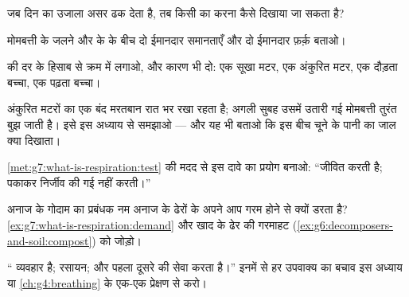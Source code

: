 \begin{exercise}[$\star$]\label{exo:g7:what-is-respiration:6}
जब दिन का उजाला असर ढक देता है, तब किसी  का  करना कैसे दिखाया
जा सकता है?
\end{exercise}

\begin{exercise}[$\star\star$]\label{exo:g7:what-is-respiration:7}
मोमबत्ती के जलने और  के  के बीच दो ईमानदार समानताएँ और दो
ईमानदार फ़र्क़ बताओ।
\end{exercise}

\begin{exercise}[$\star\star$]\label{exo:g7:what-is-respiration:8}
 की दर के हिसाब से क्रम में लगाओ, और कारण भी दो: एक सूखा मटर, एक
अंकुरित मटर, एक दौड़ता बच्चा, एक पढ़ता बच्चा।
\end{exercise}

\begin{exercise}[$\star\star$]\label{exo:g7:what-is-respiration:9}
अंकुरित मटरों का एक बंद मरतबान रात भर रखा रहता है; अगली सुबह उसमें
उतारी गई मोमबत्ती तुरंत बुझ जाती है। इसे इस अध्याय से समझाओ --- और यह
भी बताओ कि इस बीच चूने के पानी का जाल क्या दिखाता।
\end{exercise}

\begin{exercise}[$\star\star$]\label{exo:g7:what-is-respiration:10}
\cref{met:g7:what-is-respiration:test} की मदद से इस दावे का प्रयोग
बनाओ: ``जीवित   करती है; पकाकर निर्जीव की गई  नहीं
करती।''
\end{exercise}

\begin{exercise}[$\star\star$]\label{exo:g7:what-is-respiration:11}
अनाज के गोदाम का प्रबंधक नम अनाज के ढेरों के अपने आप गरम होने से क्यों
डरता है? \cref{ex:g7:what-is-respiration:demand} और खाद के ढेर की
गरमाहट (\cref{ex:g6:decomposers-and-soil:compost}) को जोड़ो।
\end{exercise}

\begin{exercise}[$\star\star\star$]\label{exo:g7:what-is-respiration:12}
`` व्यवहार है;  रसायन; और पहला दूसरे की सेवा करता
है।'' इनमें से हर उपवाक्य का बचाव इस अध्याय या
\cref{ch:g4:breathing} के एक-एक प्रेक्षण से करो।
\end{exercise}

